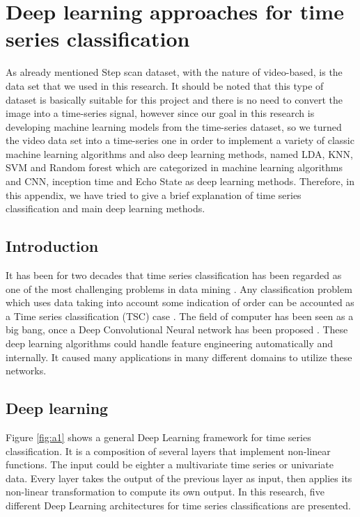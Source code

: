 
\section{Deep learning approaches for time series classification}
\label{appendix:2}

As already mentioned Step scan dataset, with the nature of video-based, is the data set that we used in this research. It should be noted that this type of dataset is basically suitable for this project and there is no need to convert the image into a time-series signal, however since our goal in this research is developing machine learning models from the time-series dataset, so we turned the video data set into a time-series one in order to implement a variety of classic machine learning algorithms and also deep learning methods, named LDA, KNN, SVM and Random forest which are categorized in machine learning algorithms and CNN, inception time and Echo State as deep learning methods. Therefore, in this appendix, we have tried to give a brief explanation of time series classification and main deep learning methods.


\subsection{Introduction}

It has been for two decades that time series classification has been regarded as one of the most challenging problems in data mining \cite{Esling2012Time-seriesMining}. Any classification problem which uses data taking into account some indication of order can be accounted as a Time series classification (TSC) case \cite{Gamboa2017DeepAnalysis}.  The field of computer has been seen as a big bang, once a Deep Convolutional Neural network has been proposed \cite{Krizhevsky2017ImageNetNetworks}. These deep learning algorithms could handle feature engineering automatically and internally. It caused many applications in many different domains to utilize these networks.  


\subsection{Deep learning}

Figure \ref{fig:a1} shows a general Deep Learning framework for time series classification. It is a composition of several layers that implement non-linear functions. The input could be eighter a multivariate time series or univariate data. Every layer takes the output of the previous layer as input, then applies its non-linear transformation to compute its own output.
In this research, five different Deep Learning architectures for time series classifications are presented. 



